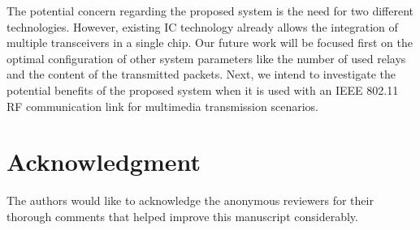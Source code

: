 \documentclass[10pt]{IEEEtran}
\newcounter{section:outage-analysis}
\begin{document}
The potential concern regarding the proposed system is the need for two different technologies. However, existing IC technology already allows the integration of multiple transceivers in a single chip. Our future work will be focused first on the optimal configuration of other system parameters like the number of used relays and the content of the transmitted packets. Next, we intend to investigate the potential benefits of the proposed system when it is used with an IEEE 802.11 RF communication link for multimedia transmission scenarios.

\section*{Acknowledgment}
The authors would like to acknowledge the anonymous reviewers for their thorough comments that helped improve this manuscript considerably.
\end{document}
